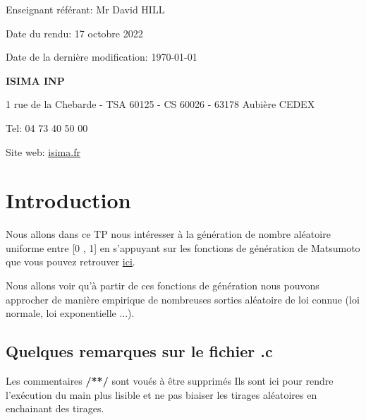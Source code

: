\documentclass[12pt,french]{article} %
\begin{document}
\begin{titlepage}
  \vspace*{2cm} 
  
  \begin{flushright}\footnotesize %
    Enseignant référant: Mr David HILL
    
    Date du rendu: 17 octobre 2022
    
    Date de la dernière modification: \today 
    
  \end{flushright}
  
  \begin{flushleft}\small %
    \textbf{ISIMA INP}
    \footnotesize
    
    1 rue de la Chebarde - TSA 60125 - CS 60026 - 63178 Aubière CEDEX
    
    Tel: 04 73 40 50 00
    
    Site web: \href{https://www.isima.fr/}{isima.fr}\newline	
  \end{flushleft}
\end{titlepage}	


\renewcommand{\contentsname}{Table des Matières}
\normalsize\tableofcontents %

\bigskip

\section*{Introduction}

Nous allons dans ce TP nous intéresser  à la génération de nombre aléatoire uniforme entre [0 , 1] en s'appuyant sur les fonctions de génération de Matsumoto que vous pouvez retrouver \href{http://www.math.sci.hiroshima-u.ac.jp/m-mat/eindex.html}{\underline{ici}}.

Nous allons voir qu'à partir de ces fonctions de génération nous pouvons approcher de manière empirique de nombreuses sorties aléatoire de loi connue (loi normale, loi exponentielle ...).

\subsection*{Quelques remarques sur le fichier .c}

Les commentaires \textbf{/**/} sont voués à être supprimés Ils sont ici pour rendre l'exécution du main plus lisible et ne pas biaiser les tirages aléatoires en enchainant des tirages.
\end{document}
